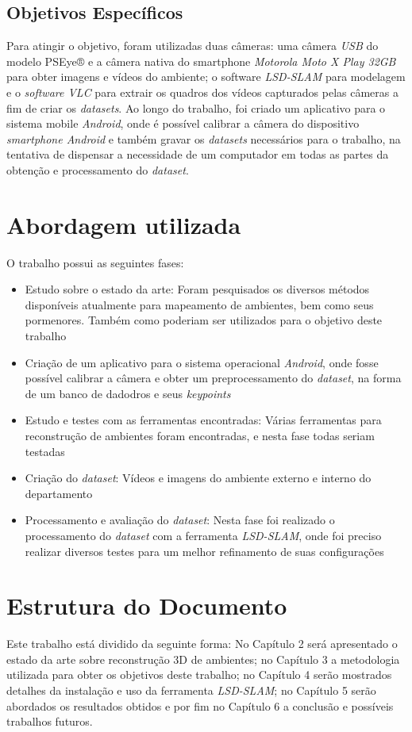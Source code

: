 \subsection{Objetivos Específicos}

Para atingir o objetivo, foram utilizadas duas câmeras: uma câmera \textit{USB} do modelo PSEye® e a câmera nativa do smartphone \textit{Motorola Moto X Play 32GB} para obter imagens e vídeos do ambiente; o software \textit{LSD-SLAM} \cite{LSD-SLAM-Artigo} para modelagem e o \textit{software VLC} para extrair os quadros dos vídeos capturados pelas câmeras a fim de criar os \textit{datasets}. Ao longo do trabalho, foi criado um aplicativo para o sistema mobile \textit{Android}, onde é possível calibrar a câmera do dispositivo \textit{smartphone Android} e também gravar os \textit{datasets} necessários para o trabalho, na tentativa de dispensar a necessidade de um computador em todas as partes da obtenção e processamento do \textit{dataset}.


\section{Abordagem utilizada}

O trabalho possui as seguintes fases:
\begin{itemize}
\item{Estudo sobre o estado da arte: Foram pesquisados os diversos métodos disponíveis atualmente para mapeamento de ambientes, bem como seus pormenores. Também como  poderiam ser utilizados para o objetivo deste trabalho}
\item{Criação de um aplicativo para o sistema operacional \textit{Android}, onde fosse possível calibrar a câmera e obter um preprocessamento do \textit{dataset}, na forma de um banco de dadodros e seus \textit{keypoints}}
\item{Estudo e testes com as ferramentas encontradas: Várias ferramentas para reconstrução de ambientes foram encontradas, e nesta fase todas seriam testadas}
\item{Criação do \textit{dataset}: Vídeos e imagens do ambiente externo e interno do departamento}
\item{Processamento e avaliação do \textit{dataset}: Nesta fase foi realizado o processamento do \textit{dataset} com a ferramenta \textit{LSD-SLAM}, onde foi preciso realizar diversos testes para um melhor refinamento de suas configurações}
\end{itemize}


\section{Estrutura do Documento}


Este trabalho está dividido da seguinte forma: No Capítulo 2 será apresentado o estado da arte sobre reconstrução 3D de ambientes; no Capítulo 3 a metodologia utilizada para obter os objetivos deste trabalho; no Capítulo 4 serão mostrados detalhes da instalação e uso da ferramenta \textit{LSD-SLAM}; no Capítulo 5 serão abordados os resultados obtidos e por fim no Capítulo 6 a conclusão e possíveis trabalhos futuros.

